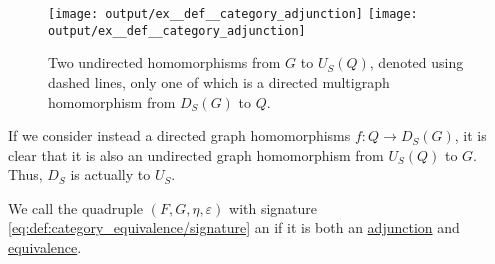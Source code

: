 \begin{example}
\begin{thmenum}
    \begin{figure}[!ht]
      \hfill
      \texttt{[image: output/ex\_\_def\_\_category\_adjunction]}
      \hfill
      \texttt{[image: output/ex\_\_def\_\_category\_adjunction]}
      \hfill\hfill
      \caption{Two undirected homomorphisms from \( G \) to \( U_S(Q) \), denoted using dashed lines, only one of which is a directed multigraph homomorphism from \( D_S(G) \) to \( Q \).}
      \label{fig:ex:def:category_adjunction/us_ds}
    \end{figure}

    If we consider instead a directed graph homomorphisms \( f: Q \to D_S(G) \), it is clear that it is also an undirected graph homomorphism from \( U_S(Q) \) to \( G \). Thus, \( D_S \) is actually  to \( U_S \).
  \end{thmenum}
\end{example}

\begin{definition}\label{def:adjoint_equivalence}
  We call the quadruple \( (F, G, \eta, \varepsilon) \) with signature \eqref{eq:def:category_equivalence/signature} an  if it is both an \hyperref[def:category_adjunction]{adjunction} and \hyperref[def:category_equivalence]{equivalence}.
\end{definition}

